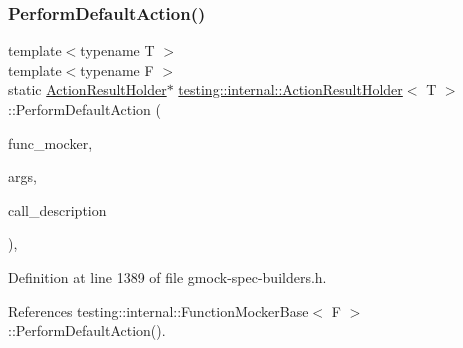 \subsubsection{\texorpdfstring{Perform\+Default\+Action()}{PerformDefaultAction()}}
{\footnotesize\ttfamily template$<$typename T $>$ \\
template$<$typename F $>$ \\
static \hyperlink{classtesting_1_1internal_1_1ActionResultHolder}{Action\+Result\+Holder}$\ast$ \hyperlink{classtesting_1_1internal_1_1ActionResultHolder}{testing\+::internal\+::\+Action\+Result\+Holder}$<$ T $>$\+::Perform\+Default\+Action (\begin{DoxyParamCaption}\item[{const \hyperlink{classtesting_1_1internal_1_1FunctionMockerBase}{Function\+Mocker\+Base}$<$ F $>$ $\ast$}]{func\+\_\+mocker,  }\item[{const typename \hyperlink{structtesting_1_1internal_1_1Function}{Function}$<$ F $>$\+::Argument\+Tuple \&}]{args,  }\item[{const \hyperlink{namespacetesting_1_1internal_a8e8ff5b11e64078831112677156cb111}{string} \&}]{call\+\_\+description }\end{DoxyParamCaption})\hspace{0.3cm}{\ttfamily [inline]}, {\ttfamily [static]}}



Definition at line 1389 of file gmock-\/spec-\/builders.\+h.



References testing\+::internal\+::\+Function\+Mocker\+Base$<$ F $>$\+::\+Perform\+Default\+Action().


